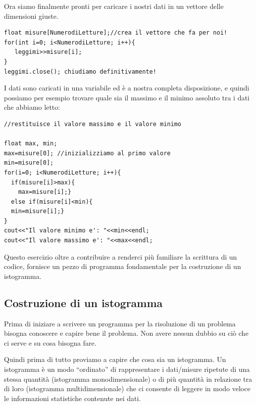 \documentclass[11pt,fleqn]{book} %
\begin{document}
Ora siamo finalmente pronti per caricare i nostri dati in un vettore delle dimensioni giuste.

\begin{verbatim}
float misure[NumerodiLetture];//crea il vettore che fa per noi!
for(int i=0; i<NumerodiLetture; i++){                     
   leggimi>>misure[i];
}
leggimi.close(); chiudiamo definitivamente!
\end{verbatim}

I dati sono caricati in una variabile ed è a nostra completa disposizione, e quindi possiamo per esempio trovare quale sia il massimo e il minimo assoluto tra i dati che abbiamo letto:


\begin{verbatim}
//restituisce il valore massimo e il valore minimo

float max, min;
max=misure[0]; //inizializziamo al primo valore
min=misure[0];
for(i=0; i<NumerodiLetture; i++){
  if(misure[i]>max){
    max=misure[i];}
  else if(misure[i]<min){
  min=misure[i];}
}
cout<<"Il valore minimo e': "<<min<<endl;
cout<<"Il valore massimo e': "<<max<<endl;
\end{verbatim}

Questo esercizio oltre a contribuire a renderci più familiare la scrittura di un codice, fornisce un pezzo di programma fondamentale per la costruzione di un istogramma.



\subsection{Costruzione di un istogramma}
\label{istocostr}

Prima di iniziare a scrivere un programma per la risoluzione di un problema bisogna conoscere e capire bene il problema. Non avere nessun dubbio su ciò che ci serve e su cosa bisogna fare.

Quindi prima di tutto proviamo a capire che cosa sia un istogramma.
Un istogramma è un modo ``ordinato'' di rappresentare i dati/misure ripetute di una stessa quantità (istogramma monodimensionale) o di più quantità in relazione tra di loro (istogramma multidimensionale) che ci consente di leggere in modo veloce le informazioni statistiche contenute nei dati.
\end{document}
